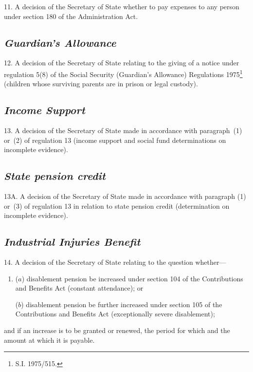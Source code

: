 \documentclass[12pt,a4paper]{article}
\begin{document}
11.  A decision of the Secretary of State whether to pay expenses to any person under section 180 of the Administration Act.

\subsection*{\itshape Guardian’s Allowance}

12.  A decision of the Secretary of State relating to the giving of a notice under regulation 5(8) of the Social Security (Guardian’s Allowance) Regulations 1975\footnote{\frenchspacing S.I. 1975/515.} (children whose surviving parents are in prison or legal custody).

\subsection*{\itshape Income Support}

13.  A decision of the Secretary of State 
made in accordance with paragraph~(1) or~(2) of regulation 13 (income support and social fund determinations on incomplete evidence).


\subsection*{\itshape State pension credit}

13A.  A decision of the Secretary of State made in accordance with paragraph (1) or~(3) of regulation 13 in relation to state pension credit (determination on incomplete evidence).


\subsection*{\itshape Industrial Injuries Benefit}

14.  A decision of the Secretary of State relating to the question whether—
\begin{enumerate}\item[]
($a$) disablement pension be increased under section 104 of the Contributions and Benefits Act (constant attendance); or

($b$) disablement pension be further increased under section 105 of the Contributions and Benefits Act (exceptionally severe disablement);
\end{enumerate}
and if an increase is to be granted or renewed, the period for which and the amount at which it is payable.
\end{document}
